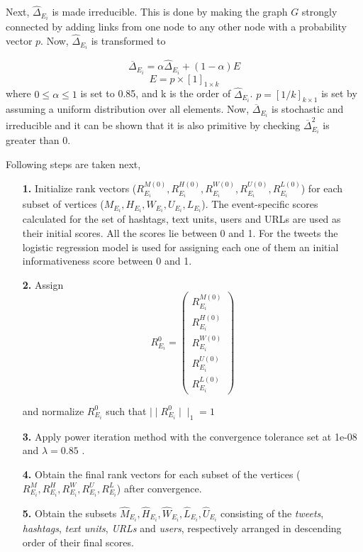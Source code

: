 Next, $\hat \Delta_{E_{i}}$ is made irreducible. This is done by making the graph $G$ strongly connected by adding links from one node to any other node with a probability vector $p$. Now, $\hat \Delta_{E_{i}}$ is transformed to 

\begin{equation}
\overline \Delta_{E_{i}} = \alpha \hat \Delta_{E_{i}} + (1-\alpha)E
\end{equation}
\begin{equation}
E = p \times [1]_{1 \times k}
\end{equation}
where $0 \le \alpha \le 1$ is set to 0.85, and k is the order of $\hat \Delta_{E_{i}}$. $p = [1/k]_{k \times 1}$ is set by assuming a uniform distribution over all elements. Now, $\overline \Delta_{E_{i}}$ is stochastic and irreducible and it can be shown that it is also primitive by checking $\overline \Delta_{E_{i}}^{2}$ is greater than $0$.

Following steps are taken next,
\begin{itemize}
\item[\textbf{1.}] Initialize rank vectors ($ R_{{E_{i}}}^{M(0)}, R_{{E_{i}}}^{H(0)}, R_{{E_{i}}}^{W(0)}, R_{{E_{i}}}^{U(0)}, R_{{E_{i}}}^{L(0)}$) for each subset of vertices ($M_{E_{i}}, H_{E_{i}}, W_{E_{i}}, U_{E_{i}}, L_{E_{i}}$). The event-specific scores calculated for the set of hashtags, text units, users and URLs are used as their initial scores. All the scores lie between 0 and 1. For the tweets the logistic regression model is used for assigning each one of them an initial informativeness score between 0 and 1.

\item[\textbf{2.}] Assign
\[ R_{E_{i}}^{0} = \left( \begin{array}{c}
R_{{E_{i}}}^{M(0)} \\
R_{{E_{i}}}^{H(0)} \\
R_{{E_{i}}}^{W(0)} \\
R_{{E_{i}}}^{U(0)} \\
R_{{E_{i}}}^{L(0)} \end{array} \right)\] 

and normalize $R_{E_{i}}^{0}$ such that $\mid \mid R_{E_{i}}^{0}\mid \mid_{1} = 1$

\item[\textbf{3.}] Apply power iteration method with the convergence tolerance set at 1e-08 and $\lambda = 0.85$ .

\item[\textbf{4.}] Obtain the final rank vectors for each subset of the vertices ($R_{{E_{i}}}^{M}, R_{{E_{i}}}^{H}, R_{{E_{i}}}^{W}, R_{{E_{i}}}^{U}, R_{{E_{i}}}^{L}$) after convergence. 

\item[\textbf{5.}] Obtain the subsets $\hat{M}_{E_{i}}, \hat{H}_{E_{i}}, \hat{W}_{E_{i}}, \hat{L}_{E_{i}}, \hat{U}_{E_{i}}$ consisting of the \textit{tweets}, \textit{hashtags}, \textit{text units}, \textit{URLs} and \textit{users}, respectively arranged in descending order of their final scores.

\end{itemize}

